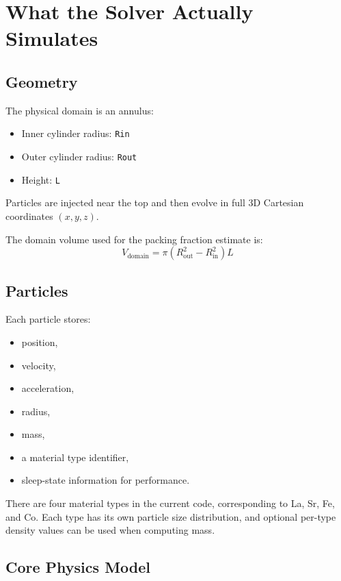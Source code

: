 \documentclass[11pt]{article}
\begin{document}
\section{What the Solver Actually Simulates}

\subsection{Geometry}

The physical domain is an annulus:
\begin{itemize}
  \item Inner cylinder radius: \texttt{Rin}
  \item Outer cylinder radius: \texttt{Rout}
  \item Height: \texttt{L}
\end{itemize}

Particles are injected near the top and then evolve in full 3D Cartesian coordinates \((x,y,z)\).

The domain volume used for the packing fraction estimate is:
\[
V_{\text{domain}} = \pi (R_{\text{out}}^2 - R_{\text{in}}^2)L
\]

\subsection{Particles}

Each particle stores:
\begin{itemize}
  \item position,
  \item velocity,
  \item acceleration,
  \item radius,
  \item mass,
  \item a material type identifier,
  \item sleep-state information for performance.
\end{itemize}

There are four material types in the current code, corresponding to La, Sr, Fe, and Co. Each type has its own particle size distribution, and optional per-type density values can be used when computing mass.

\subsection{Core Physics Model}
\end{document}
